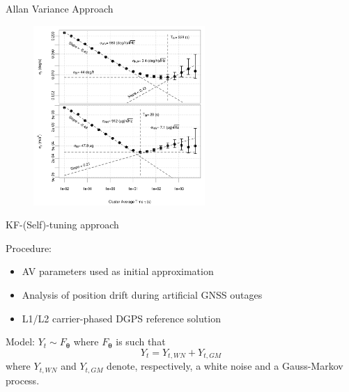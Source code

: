 \documentclass[envcountsect,usenames,dvipsnames]{beamer}
\theoremstyle{mystyle}
\begin{document}
\begin{frame}{Allan Variance Approach}
	\vspace{0.3cm}
	\begin{figure}
	    \centering
	  \includegraphics[width = 6.5cm]{Images/mtig_adev}
	\end{figure}
\end{frame}

\begin{frame}{KF-(Self)-tuning approach}
	\begin{block}{Procedure:}
		\begin{itemize}
			\item AV parameters used as initial approximation
			\item Analysis of position drift during artificial GNSS outages
			\item L1/L2 carrier-phased DGPS reference solution
		\end{itemize}
	\end{block}
	
	\begin{exampleblock}{Model:}
		$Y_t \sim F_{\bm{\theta}}$ where $F_{\bm{\theta}}$ is such that
		\begin{equation*}
			Y_t = Y_{t,WN} + Y_{t,GM}
		\end{equation*}
		where $Y_{t,WN}$ and $Y_{t,GM}$ denote, respectively, a white noise and a Gauss-Markov process.
	\end{exampleblock}
\end{frame}
\end{document}
